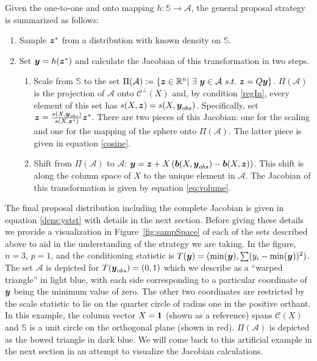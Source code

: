 \documentclass[ba]{imsart}
\newcommand{\by}{\mbox{\boldmath $y$}}
\newcommand{\bz}{\mbox{\boldmath $z$}}
\newcommand{\bb}{\mbox{\boldmath $b$}}
\newcommand{\mc}{\mathcal}
\begin{document}
Given the one-to-one and onto mapping $h: \mathbb{S} \rightarrow \mathcal{A}$, the general proposal strategy is summarized as follows:
\begin{enumerate}
\item Sample $\bz^*$ from a distribution with known density on $\mathbb{S}$.
\item Set $\by = h(\bz^*)$ and calculate the Jacobian of this transformation in two steps.
\begin{enumerate}
\item Scale from $\mathbb{S}$ to the set $\Pi(\mathcal{A}):= \{\bz\in \mathbb{R}^n |\ \exists\ \by\in \mathcal{A}\ s.t.\ \bz=Q \by \}$. $\Pi(\mathcal{A})$ is the projection of $\mathcal{A}$ onto $\mathcal{C}^{\perp}(X)$ and, by condition \ref{regIn}, every element of this set has $s(X, \bz) = s(X, \by_{obs})$. Specifically, set $\bz=\frac{s(X,\boldsymbol{y}_{obs})}{s(X, \boldsymbol{z}^{*})}\bz^{*}$. There are two pieces of this Jacobian: one for the scaling and one for the mapping of the sphere onto $\Pi(\mathcal{A})$. The latter piece is given in equation \eqref{cosine}.
\item Shift  from $\Pi(\mathcal{A})$ to $\mathcal{A}$: $\by=\bz+X\left(\bb(X, \by_{obs})-\bb(X, \bz)\right)$. This shift is along the column space of $X$ to the unique element in $\mathcal{A}$. The Jacobian of this transformation is given by equation \eqref{eq:volume}.
\end{enumerate}
\end{enumerate}
The final proposal distribution including the complete Jacobian is given in equation \eqref{dens:ystst} with details in the next section. Before giving these details we provide a visualization  in Figure~\ref{fig:sampSpace} of each of the sets described above to aid in the understanding of the strategy we are taking. In the figure, $n = 3$, $p=1$, and the conditioning statistic is $T(\by)=(\min(\by), \sum (y_i - \min(\by))^2)$. The set $\mathcal{A}$ is depicted for $T(\by_{obs})=(0,1)$ which we describe as a ``warped triangle'' in light blue, with each side corresponding to a particular coordinate of $\by$ being the minimum value of zero. The other two coordinates are restricted by the scale statistic to lie on the quarter circle of radius one in the positive orthant. In this example, the column vector $X=\bf{1}$ (shown as a reference) spans $\mc{C}(X)$  and $\mathbb{S}$ is a unit circle on the orthogonal plane (shown in red). $\Pi(\mathcal{A})$ is depicted as the bowed triangle in dark blue. We will come back to this artificial example in the next section in an attempt to visualize the Jacobian calculations.
\end{document}
